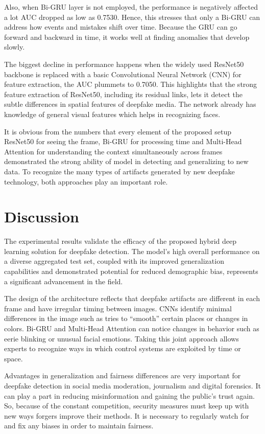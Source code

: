 \documentclass[conference]{IEEEtran}
\begin{document}
Also, when Bi-GRU layer is not employed, the performance is negatively affected a lot AUC dropped as low as 0.7530. Hence, this stresses that only a Bi-GRU can address how events and mistakes shift over time. Because the GRU can go forward and backward in time, it works well at finding anomalies that develop slowly.

The biggest decline in performance happens when the widely used ResNet50 backbone is replaced with a basic Convolutional Neural Network (CNN) for feature extraction, the AUC plummets to 0.7050. This highlights that the strong feature extraction of ResNet50, including its residual links, lets it detect the subtle differences in spatial features of deepfake media. The network already has knowledge of general visual features which helps in recognizing faces.

It is obvious from the numbers that every element of the proposed setup ResNet50 for seeing the frame, Bi-GRU for processing time and Multi-Head Attention for understanding the context simultaneously across frames demonstrated the strong ability of model in detecting and generalizing to new data. To recognize the many types of artifacts generated by new deepfake technology, both approaches play an important role.


\section{Discussion}
The experimental results validate the efficacy of the proposed hybrid deep learning solution for deepfake detection. The model's high overall performance on a diverse aggregated test set, coupled with its improved generalization capabilities and demonstrated potential for reduced demographic bias, represents a significant advancement in the field.



The design of the architecture reflects that deepfake artifacts are different in each frame and have irregular timing between images. CNNs identify minimal differences in the image such as tries to “smooth” certain places or changes in colors. Bi-GRU and Multi-Head Attention can notice changes in behavior such as eerie blinking or unusual facial emotions. Taking this joint approach allows experts to recognize ways in which control systems are exploited by time or space.

Advantages in generalization and fairness differences are very important for deepfake detection in social media moderation, journalism and digital forensics. It can play a part in reducing misinformation and gaining the public’s trust again. So, because of the constant competition, security measures must keep up with new ways forgers improve their methods. It is necessary to regularly watch for and fix any biases in order to maintain fairness.
\end{document}
